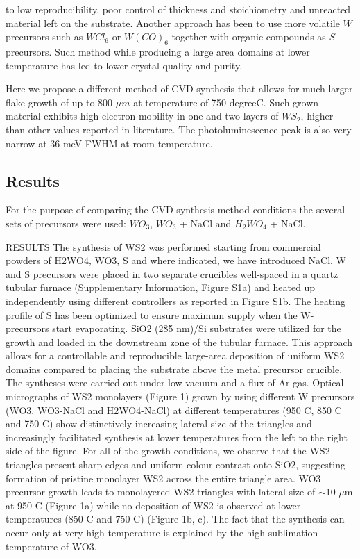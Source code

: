 \documentclass[12pt]{article}
\begin{document}
to low reproducibility, poor control of thickness and stoichiometry and unreacted material left on the substrate. Another approach has been to use more volatile $W$ precursors such as $WCl_6$\cite{Carmalt2003} or $W(CO)_6$\cite{Kang2015}\cite{Eichfeld2015} together with organic compounds as $S$ precursors. Such method while producing a large area domains at lower temperature has led to lower crystal quality and purity.

Here we propose a different method of CVD synthesis that allows for much larger flake growth of up to 800 $\mu m$ at temperature of 750 {degree}C. Such grown material exhibits high electron mobility in one and two layers of $WS_2$, higher than other values reported in literature. The photoluminescence peak is also very narrow at 36 meV FWHM at room temperature. 

	\subsection{Results}
	
For the purpose of comparing the CVD synthesis method conditions the several sets of precursors were used: $WO_3$, $WO_3$ + NaCl and $H_2WO_4$ + NaCl.




RESULTS
The synthesis of WS2 was performed starting from commercial powders of H2WO4, WO3, S and where indicated, we have introduced NaCl. W and S precursors were placed in two separate crucibles well-spaced in a quartz tubular furnace (Supplementary Information, Figure S1a) and heated up independently using different controllers as reported in Figure S1b. The heating profile of S has been optimized to ensure maximum supply when the W-precursors start evaporating. SiO2 (285 nm)/Si substrates were utilized for the growth and loaded in the downstream zone of the tubular furnace. This approach allows for a controllable and reproducible large-area deposition of uniform WS2 domains compared to placing the substrate above the metal precursor crucible. The syntheses were carried out under low vacuum and a flux of Ar gas. Optical micrographs of WS2 monolayers (Figure 1) grown by using different W precursors (WO3, WO3-NaCl and H2WO4-NaCl) at different temperatures (950 {\degree}C, 850 {\degree}C and 750 {\degree}C) show distinctively increasing lateral size of the triangles and increasingly facilitated synthesis at lower temperatures from the left to the right side of the figure. For all of the growth conditions, we observe that the WS2 triangles present sharp edges and uniform colour contrast onto SiO2, suggesting formation of pristine monolayer WS2 across the entire triangle area. WO3 precursor growth leads to monolayered WS2 triangles with lateral size of {$\sim$}10 {$\mu$}m at 950 {\degree}C (Figure 1a) while no deposition of WS2 is observed at lower temperatures (850 {\degree}C and 750 {\degree}C) (Figure 1b, c). The fact that the synthesis can occur only at very high temperature is explained by the high sublimation temperature of WO3.  
 
\end{document}
